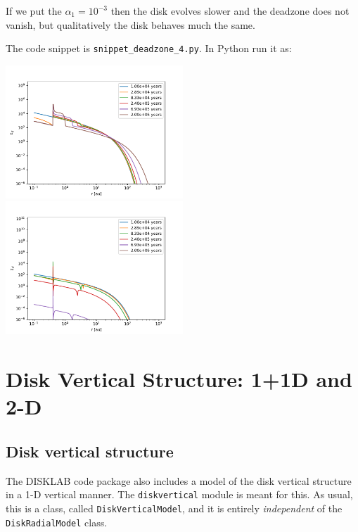 \documentclass{book}
\newcommand{\code}[1]{{\small\tt #1}}
\begin{document}
If we put the $\alpha_1=10^{-3}$ then the disk evolves slower and the deadzone does
not vanish, but qualitatively the disk behaves much the same.

The code snippet is
\code{snippet\_deadzone\_4.py}. In Python run it as:
\begin{codebox}
\end{codebox}
\centerline{\includegraphics[width=0.5\textwidth]{../snippets/fig_snippet_deadzone_4_1.pdf}
  \includegraphics[width=0.5\textwidth]{../snippets/fig_snippet_deadzone_4_2.pdf}}



\part{Disk Vertical Structure: 1+1D and 2-D}\label{part-vert-struct}

\chapter{Disk vertical structure}
\label{chap-vertical-structure}
The {\sf DISKLAB} code package also includes a model of the disk vertical
structure in a 1-D vertical manner. The \code{diskvertical} module is meant for
this. As usual, this is a class, called \code{DiskVerticalModel}, and it is entirely
{\em independent} of the \code{DiskRadialModel} class.
\end{document}
